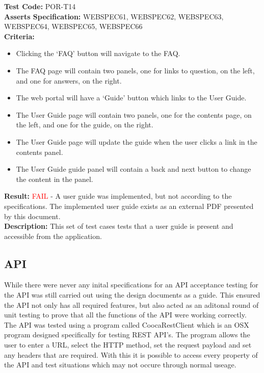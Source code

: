 \documentclass[11pt,a4paper]{report}
\begin{document}
\label{test:POR-T14}
\noindent\textbf{Test Code:} POR-T14\\
\textbf{Asserts Specification:} WEBSPEC61, WEBSPEC62, WEBSPEC63, WEBSPEC64, WEBSPEC65, WEBSPEC66\\ 
\textbf{Criteria:} \begin{itemize}
                     \item  Clicking the `FAQ' button will navigate to the FAQ.
                     \item The FAQ page will contain two panels, one for links to question, on the left, and one for answers, on the right.
                     \item The web portal will have a `Guide' button which links to the User Guide.
                     \item The User Guide page will contain two panels, one for the contents page, on the left, and one for the guide, on the right.
                     \item The User Guide page will update the guide when the user clicks a link in the contents panel.
                     \item The User Guide guide panel will contain a back and next button to change the content in the panel.
                   \end{itemize}  
\textbf{Result:} \textcolor{red}{FAIL} - A user guide was implemented, but not according to the specifications. The implemented user guide exists as an external PDF presented by this document.\\
\textbf{Description:} This set of test cases tests that a user guide is present and accessible from the application. \\

\subsection{API}

While there were never any inital specifications for an API acceptance testing for the API was still carried out using the design documents as a guide. This ensured the API not only has all required features, but also acted as an aditonal round of unit testing to prove that all the functions of the API were working correctly. The API was tested using a program called CoocaRestClient which is an OSX program designed specifically for testing REST API's. The program allows the user to enter a URL, select the HTTP method, set the request payload and set any headers that are required. With this it is possible to access every property of the API and test situations which may not occure through normal useage. \\
\end{document}
